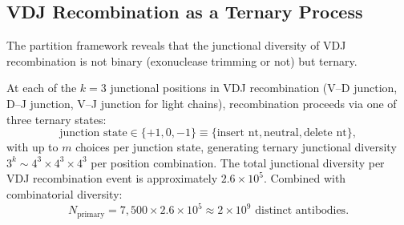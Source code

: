 \subsection{VDJ Recombination as a Ternary Process}

The partition framework reveals that the junctional diversity of VDJ
recombination is not binary (exonuclease trimming or not) but ternary.

\begin{theorem}
\label{thm:vdj_ternary}
At each of the $k = 3$ junctional positions in VDJ recombination
(V--D junction, D--J junction, V--J junction for light chains),
recombination proceeds via one of three ternary states:
\begin{equation}
  \text{junction state} \in \{+1, 0, -1\} \equiv \{\text{insert nt}, \text{neutral}, \text{delete nt}\},
\end{equation}
with up to $m$ choices per junction state, generating ternary junctional
diversity $3^k \sim 4^3 \times 4^3 \times 4^3$ per position combination.
The total junctional diversity per VDJ recombination event is approximately
$2.6 \times 10^5$. Combined with combinatorial diversity:
\begin{equation}
  N_{\mathrm{primary}} = 7{,}500 \times 2.6 \times 10^5 \approx 2 \times 10^9 \text{ distinct antibodies.}
\end{equation}
\end{theorem}

